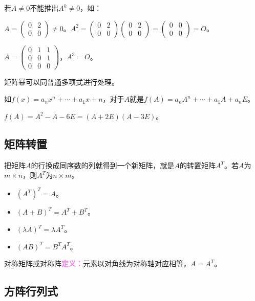 \documentclass[UTF8, 12pt]{ctexart}
\begin{document}
若$A\neq 0$不能推出$A^k\neq 0$，如：

$A=\left(
    \begin{array}{cc}
        0 & 2 \\
        0 & 0
    \end{array}
\right)\neq 0$。$A^2=\left(
    \begin{array}{cc}
        0 & 2 \\
        0 & 0
    \end{array}
\right)\left(
    \begin{array}{cc}
        0 & 2 \\
        0 & 0
    \end{array}
\right)=\left(
    \begin{array}{cc}
        0 & 0 \\
        0 & 0
    \end{array}
\right)=O$。

$A=\left(
    \begin{array}{ccc}
        0 & 1 & 1 \\
        0 & 0 & 1 \\
        0 & 0 & 0
    \end{array}
\right)$，$A^3=O$。

矩阵幂可以同普通多项式进行处理。

如$f(x)=a_nx^n+\cdots+a_1x+n$，对于$A$就是$f(A)=a_nA^n+\cdots+a_1A+a_nE$。

$f(A)=A^2-A-6E=(A+2E)(A-3E)$。

\subsection{矩阵转置}

把矩阵$A$的行换成同序数的列就得到一个新矩阵，就是$A$的转置矩阵$A^T$。若$A$为$m\times n$，则$A^T$为$n\times m$。

\begin{itemize}
    \item $(A^T)^T=A$。
    \item $(A+B)^T=A^T+B^T$。
    \item $(\lambda A)^T=\lambda A^T$。
    \item $(AB)^T=B^TA^T$。
\end{itemize}

对称矩阵或对称阵\textcolor{violet}{\textbf{定义：}}元素以对角线为对称轴对应相等，$A=A^T$。

\subsection{方阵行列式}
\end{document}
